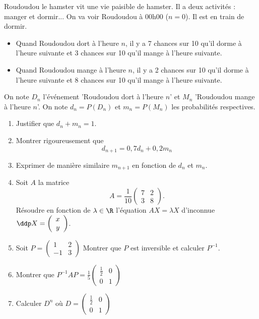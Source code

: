 





\begin{exercice}
Roudoudou le hamster vit une vie paisible de hamster. Il a deux activités : manger et  dormir... 
On va voir Roudoudou à 00h00 ($n=0$). Il est en train de dormir. 
\begin{itemize}
\item Quand Roudoudou dort à l'heure $n$, il y a 7 chances sur 10 qu'il dorme à l'heure suivante et 3 chances sur 10 qu'il mange à l'heure suivante. 
\item Quand Roudoudou mange à l'heure $n$, il y a 2 chances sur 10 qu'il dorme à l'heure suivante et 8 chances sur 10 qu'il mange à l'heure suivante. 
\end{itemize}


On note $D_n$ l'événement 'Roudoudou dort à l'heure $n$' et $M_n$ 'Roudoudou mange à l'heure $n$'. On note $d_n =P(D_n)$ et $m_n=P(M_n)$ les probabilités respectives. 


\begin{enumerate}
\item Justifier que $d_n+m_n=1$. 
\item Montrer rigoureusement que $$d_{n+1} =  0,7d_n+0,2m_n$$
\item Exprimer de manière similaire $m_{n+1} $ en fonction de $d_n$ et $m_n$. 

\item Soit $A$ la matrice $$A=\frac{1}{10}\left(\begin{array}{ccc}
7 & 2\\
3 & 8
\end{array}
\right).$$
Résoudre en fonction de $\lambda \in \R$ l'équation $AX = \lambda X$ d'inconnue $\ddp X =\left(\begin{array}{c}
x \\
y 
\end{array}
\right)$. 
\item Soit $P = 
\left(\begin{array}{cc}
1 & 2\\	
-1 & 3
\end{array}
\right)$ Montrer que $P$ est inversible et calculer $P^{-1}$. 
\item Montrer que $P^{-1} A P =\frac{1}{5} \left(\begin{array}{cc}
 \frac{1}{2}& 0\\
0 &  1 
\end{array}
\right)$
\item Calculer $D^n$ où $D=\left(\begin{array}{cc}
 \frac{1}{2}& 0\\
0 &  1 
\end{array}
\right)$


\end{enumerate}
\end{exercice}
